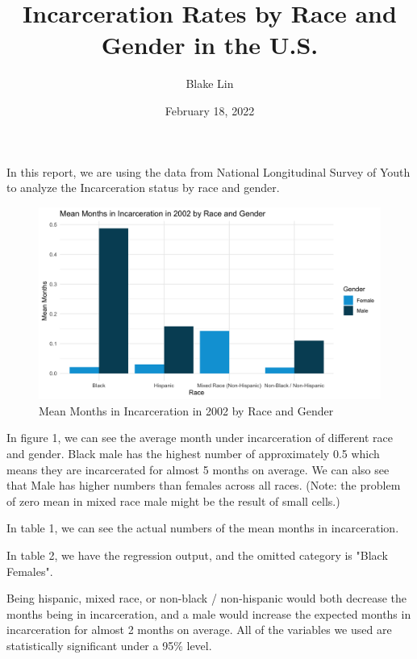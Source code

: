\documentclass{article}
\author{Blake Lin}
\title{Incarceration Rates by Race and Gender in the U.S.}
\date{February 18, 2022}
\begin{document}
\maketitle

In this report, we are using the data from National Longitudinal Survey of Youth to analyze the Incarceration status by race and gender. 



\begin{figure}[H]
    \begin{center}
        \includegraphics[width=.85\textwidth]{incarc_by_racegender}
    \end{center}
     \caption{Mean Months in Incarceration in 2002 by Race and Gender}
    \label{fig:graph}
\end{figure}

In figure 1, we can see the average month under incarceration of different race and gender. Black male has the highest number of approximately 0.5 which means they are incarcerated for almost 5 months on average. We can also see that Male has higher numbers than females across all races. 
(Note: the problem of zero mean in mixed race male might be the result of small cells.)


In table 1, we can see the actual numbers of the mean months in incarceration.



In table 2, we have the regression output, and the omitted category is "Black Females".

Being hispanic, mixed race, or non-black / non-hispanic would both decrease the months being in incarceration, and a male would increase the expected months in incarceration for almost 2 months on average. All of the variables we used are statistically significant under a 95\% level.
\end{document}
